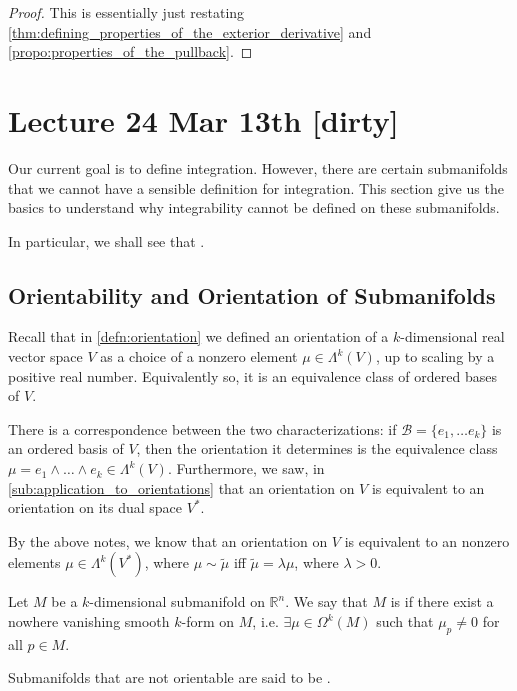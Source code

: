 \documentclass[notoc,notitlepage]{tufte-book}
\begin{document}
\begin{proof}
  This is essentially just restating
  \cref{thm:defining_properties_of_the_exterior_derivative} and
  \cref{propo:properties_of_the_pullback}.
\end{proof}



\chapter{Lecture 24 Mar 13th [dirty]}%
\label{chp:lecture_24_mar_13th}

Our current goal is to define integration. However, there are certain
submanifolds that we cannot have a sensible definition for integration. This
section give us the basics to understand why integrability cannot be defined on
these submanifolds.

In particular, we shall see that .

\section{Orientability and Orientation of Submanifolds}%
\label{sec:orientability_and_orientation_of_submanifolds}

Recall that in \cref{defn:orientation} we defined an orientation of a
$k$-dimensional real vector space $V$ as a choice of a nonzero element $\mu \in
\Lambda^k(V)$, up to scaling by a positive real number. Equivalently so, it is
an equivalence class of ordered bases of $V$.

There is a correspondence between the two characterizations: if $\mathcal{B} =
\{ e_1, \ldots e_k \}$ is an ordered basis of $V$, then the orientation it
determines is the equivalence class $\mu = e_1 \land \hdots \land e_k \in
\Lambda^k(V)$. Furthermore, we saw, in \cref{sub:application_to_orientations}
that an orientation on $V$ is equivalent to an orientation on its dual space
$V^*$.

By the above notes, we know that an orientation on $V$ is equivalent to an
nonzero elements $\mu \in \Lambda^k(V^*)$, where $\mu \sim \tilde{\mu}$ iff
$\tilde{\mu} = \lambda \mu$, where $\lambda > 0$.

\begin{defn}\label{defn:orientable_submanifolds}
  Let $M$ be a $k$-dimensional submanifold on $\mathbb{R}^n$. We say that $M$ is
   if there exist a nowhere vanishing smooth $k$-form on
  $M$, i.e. $\exists \mu \in \Omega^k(M)$ such that $\mu_p \neq 0$ for all $p
  \in M$.

  Submanifolds that are not orientable are said to be .
\end{defn}
\end{document}
